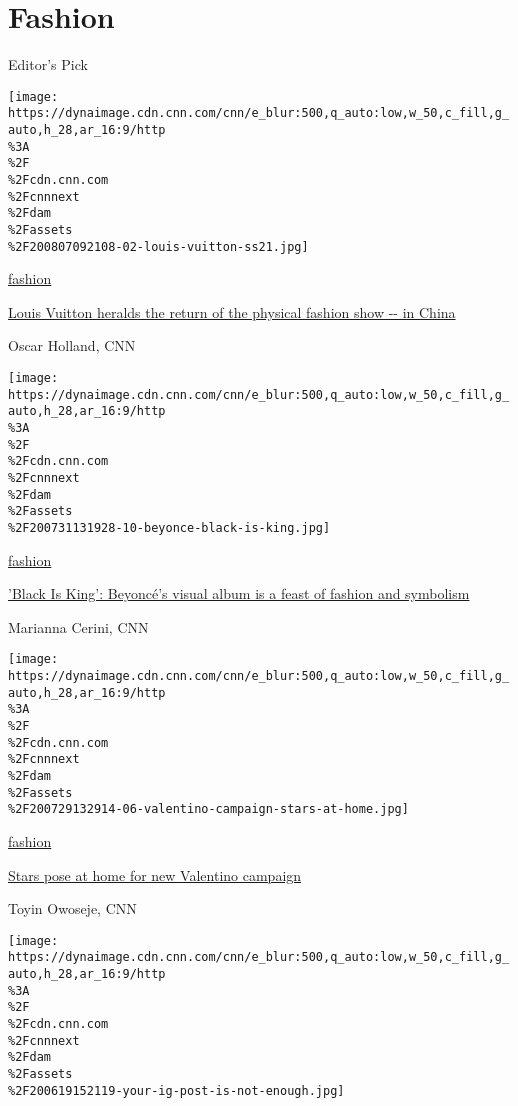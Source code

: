 \href{/}{}\href{/style}{}

\hypertarget{fashion}{%
\section{Fashion}\label{fashion}}

Editor's Pick

\href{/style/article/louis-vuitton-ss21-shanghai/index.html}{}

\texttt{[image: https://dynaimage.cdn.cnn.com/cnn/e\_blur:500,q\_auto:low,w\_50,c\_fill,g\_auto,h\_28,ar\_16:9/http\\\%3A\\\%2F\\\%2Fcdn.cnn.com\\\%2Fcnnnext\\\%2Fdam\\\%2Fassets\\\%2F200807092108-02-louis-vuitton-ss21.jpg]}

\href{/style/fashion}{fashion}

\href{/style/article/louis-vuitton-ss21-shanghai/index.html}{Louis
Vuitton heralds the return of the physical fashion show -\/- in China}

Oscar Holland, CNN

\href{/style/article/black-is-king-beyonce-fashion/index.html}{}

\texttt{[image: https://dynaimage.cdn.cnn.com/cnn/e\_blur:500,q\_auto:low,w\_50,c\_fill,g\_auto,h\_28,ar\_16:9/http\\\%3A\\\%2F\\\%2Fcdn.cnn.com\\\%2Fcnnnext\\\%2Fdam\\\%2Fassets\\\%2F200731131928-10-beyonce-black-is-king.jpg]}

\href{/style/fashion}{fashion}

\href{/style/article/black-is-king-beyonce-fashion/index.html}{'Black Is
King': Beyoncé's visual album is a feast of fashion and symbolism}

Marianna Cerini, CNN

\href{/style/article/stars-at-home-valentino-campaign-intl-scli/index.html}{}

\texttt{[image: https://dynaimage.cdn.cnn.com/cnn/e\_blur:500,q\_auto:low,w\_50,c\_fill,g\_auto,h\_28,ar\_16:9/http\\\%3A\\\%2F\\\%2Fcdn.cnn.com\\\%2Fcnnnext\\\%2Fdam\\\%2Fassets\\\%2F200729132914-06-valentino-campaign-stars-at-home.jpg]}

\href{/style/fashion}{fashion}

\href{/style/article/stars-at-home-valentino-campaign-intl-scli/index.html}{Stars
pose at home for new Valentino campaign}

Toyin Owoseje, CNN

\href{/style/article/fashion-industry-black-lives-matter/index.html}{}

\texttt{[image: https://dynaimage.cdn.cnn.com/cnn/e\_blur:500,q\_auto:low,w\_50,c\_fill,g\_auto,h\_28,ar\_16:9/http\\\%3A\\\%2F\\\%2Fcdn.cnn.com\\\%2Fcnnnext\\\%2Fdam\\\%2Fassets\\\%2F200619152119-your-ig-post-is-not-enough.jpg]}

